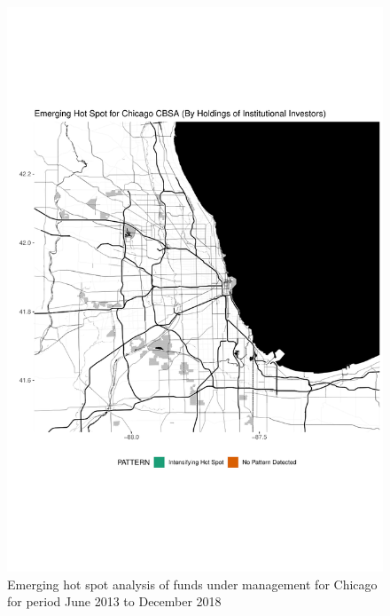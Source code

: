 \begin{figure}
	\centering
	\includegraphics[width=1\linewidth]{Figures/ChapterIV/Chi_Money_EH}
	\caption[Emerging Hot Spot Analysis of Funds Under Management for Chicago CBSA 2013-2018]{Emerging hot spot analysis of funds under management for Chicago for period June 2013 to December 2018}
	\label{fig:Chicagonmoneyhotspot}
\end{figure}

